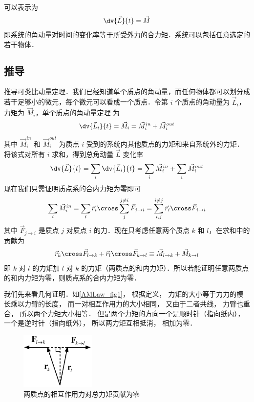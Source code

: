
可以表示为
\begin{equation}\label{AMLaw_eq1}
\dv{\vec L}{t} = \vec M
\end{equation}
即系统的角动量对时间的变化率等于所受外力的合力矩．系统可以包括任意选定的若干物体．

\subsection{推导}
推导可类比动量定理．我们已经知道单个质点的角动量，而任何物体都可以划分成若干足够小的微元，每个微元可以看成一个质点．令第 $i$ 个质点的角动量为 $\vec L_i$，力矩为 $\vec M_i$，单个质点的角动量定理 为
\begin{equation}
\dv{\vec L_i}{t} = \vec M_i = \vec M_i^{in} + \vec M_i^{out}
\end{equation}
其中 $\vec M_i^{in}$ 和 $\vec M_i^{out}$ 为质点 $i$ 受到的系统内其他质点的力矩和来自系统外的力矩．将该式对所有 $i$ 求和，得到总角动量 $\vec L$ 变化率
\begin{equation}
\dv{\vec L}{t} =\sum_i\dv{\vec L_i}{t} = \sum_i\vec M_i^{in} + \sum_i\vec M_i^{out}
\end{equation}
现在我们只需证明质点系的合内力矩为零即可
\begin{equation}
\sum_i\vec M_i^{in} = \sum_i \vec r_i\cross\sum_j^{j\ne i}\vec F_{j\to i} = \sum_{i,j}^{i\ne j} \vec r_i\cross\vec F_{j\to i}
\end{equation}
其中 $\vec F_{j\to i}$ 是质点 $j$ 对质点 $i$ 的力．现在只考虑任意两个质点 $k$ 和 $l$，在求和中的贡献为
\begin{equation}
\vec r_k\cross\vec F_{l\to k} + \vec r_l\cross\vec F_{k\to l} \equiv \vec M_{l\to k}+ \vec M_{k\to l}
\end{equation}
即 $k$ 对 $l$ 的力矩加 $l$ 对 $k$ 的力矩（两质点的和内力矩）．所以若能证明任意两质点的和内力矩为零，则质点系的合内力矩为零．

我们先来看几何证明．如\autoref{AMLaw_fig1}， 根据定义， 力矩的大小等于力力的模长乘以力臂的长度， 而一对相互作用力的大小相同， 又由于二者共线， 力臂也重合， 所以两个力矩大小相等． 但是两个力矩的方向一个是顺时针（指向纸内）， 一个是逆时针（指向纸外）， 所以两力矩互相抵消， 相加为零．

\begin{figure}[ht]
\centering
\includegraphics[width=3.7cm]{./figures/AMLaw1.pdf}
\caption{两质点的相互作用力对总力矩贡献为零}\label{AMLaw_fig1}
\end{figure}

